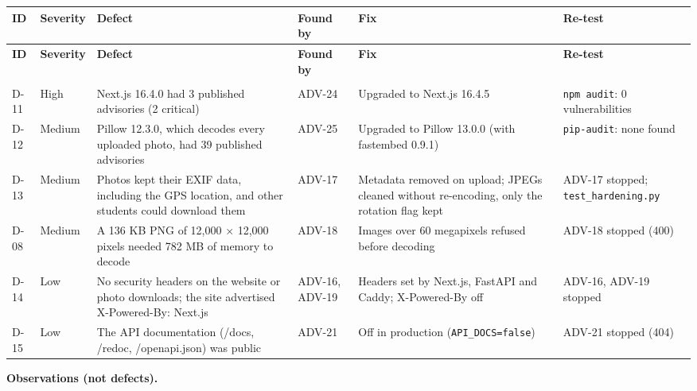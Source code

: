 {\footnotesize\setlength{\tabcolsep}{4pt}
\begin{longtable}{@{}>{\raggedright\arraybackslash}p{}>{\raggedright\arraybackslash}p{}>{\raggedright\arraybackslash}p{}>{\raggedright\arraybackslash}p{}>{\raggedright\arraybackslash}p{}>{\raggedright\arraybackslash}p{}@{}}
\toprule
\textbf{ID} & \textbf{Severity} & \textbf{Defect} & \textbf{Found by} & \textbf{Fix} & \textbf{Re-test} \\
\midrule
\endfirsthead
\toprule
\textbf{ID} & \textbf{Severity} & \textbf{Defect} & \textbf{Found by} & \textbf{Fix} & \textbf{Re-test} \\
\midrule
\endhead
\midrule\multicolumn{6}{r}{\scriptsize\itshape\color{soft}continued on the next page}\\
\endfoot
\bottomrule
\endlastfoot
D-11 & High & Next.js 16.4.0 had 3 published advisories (2 critical) & ADV-24 & Upgraded to Next.js 16.4.5 & \texttt{npm audit}: 0 vulnerabilities \\
D-12 & Medium & Pillow 12.3.0, which decodes every uploaded photo, had 39 published advisories & ADV-25 & Upgraded to Pillow 13.0.0 (with fastembed 0.9.1) & \texttt{pip-\allowbreak{}audit}: none found \\
D-13 & Medium & Photos kept their EXIF data, including the GPS location, and other students could download them & ADV-17 & Metadata removed on upload; JPEGs cleaned without re-encoding, only the rotation flag kept & ADV-17 stopped; \texttt{test\_\allowbreak{}hardening.\allowbreak{}py} \\
D-08 & Medium & A 136 KB PNG of 12,000 × 12,000 pixels needed 782 MB of memory to decode & ADV-18 & Images over 60 megapixels refused before decoding & ADV-18 stopped (400) \\
D-14 & Low & No security headers on the website or photo downloads; the site advertised X-Powered-By: Next.js & ADV-16, ADV-19 & Headers set by Next.js, FastAPI and Caddy; X-Powered-By off & ADV-16, ADV-19 stopped \\
D-15 & Low & The API documentation (/docs, /redoc, /openapi.json) was public & ADV-21 & Off in production (\texttt{API\_\allowbreak{}DOCS=\allowbreak{}false}) & ADV-21 stopped (404) \\
\end{longtable}}

\textbf{Observations (not defects).}

